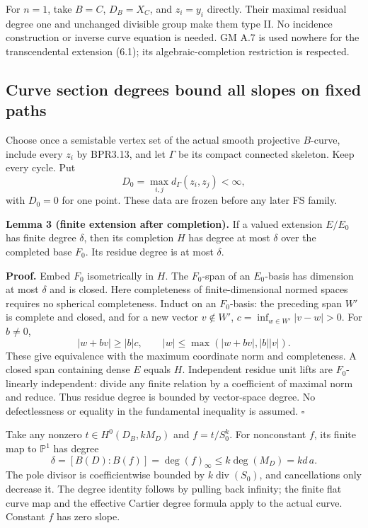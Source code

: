\documentclass[
  11pt,
]{article}
\begin{document}
For \(n=1\), take \(B=C\), \(D_B=X_C\), and \(z_i=y_i\) directly. Their
maximal residual degree one and unchanged divisible group make them type
II. No incidence construction or inverse curve equation is needed. GM
A.7 is used nowhere for the transcendental extension (6.1); its
algebraic-completion restriction is respected.

\subsection{Curve section degrees bound all slopes on fixed
paths}\label{curve-section-degrees-bound-all-slopes-on-fixed-paths}

Choose once a semistable vertex set of the actual smooth projective
\(B\)-curve, include every \(z_i\) by BPR3.13, and let \(\Gamma\) be its
compact connected skeleton. Keep every cycle. Put \[
 D_0=\max_{i,j}d_\Gamma(z_i,z_j)<\infty,
\] with \(D_0=0\) for one point. These data are frozen before any later
FS family.

\textbf{Lemma 3 (finite extension after completion).} If a valued
extension \(E/E_0\) has finite degree \(\delta\), then its completion
\(H\) has degree at most \(\delta\) over the completed base \(F_0\). Its
residue degree is at most \(\delta\).

\textbf{Proof.} Embed \(F_0\) isometrically in \(H\). The \(F_0\)-span
of an \(E_0\)-basis has dimension at most \(\delta\) and is closed. Here
completeness of finite-dimensional normed spaces requires no spherical
completeness. Induct on an \(F_0\)-basis: the preceding span \(W'\) is
complete and closed, and for a new vector \(v\notin W'\),
\(c=\inf_{w\in W'}|v-w|>0\). For \(b\ne0\), \[
 |w+bv|\geq |b|c,\qquad
 |w|\leq\max(|w+bv|,|b||v|).
\] These give equivalence with the maximum coordinate norm and
completeness. A closed span containing dense \(E\) equals \(H\).
Independent residue unit lifts are \(F_0\)-linearly independent: divide
any finite relation by a coefficient of maximal norm and reduce. Thus
residue degree is bounded by vector-space degree. No defectlessness or
equality in the fundamental inequality is assumed. \(\square\)

Take any nonzero \(t\in H^0(D_B,kM_D)\) and \(f=t/S_0^k\). For
nonconstant \(f\), its finite map to \(\mathbb P^1\) has degree \[
 \delta=[B(D):B(f)]=\deg(f)_\infty
       \leq k\deg(M_D)=kd\,a. \tag{7.1}
\] The pole divisor is coefficientwise bounded by
\(k\operatorname{div}(S_0)\), and cancellations only decrease it. The
degree identity follows by pulling back infinity; the finite flat curve
map and the effective Cartier degree formula apply to the actual curve.
Constant \(f\) has zero slope.
\end{document}
